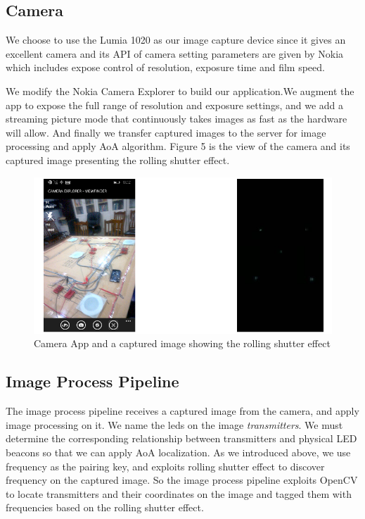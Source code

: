 \documentclass[a4paper, 11pt]{article} %
\begin{document}
\subsection{Camera}
We choose to use the Lumia 1020 as our image capture device since it gives an excellent camera and its API of camera setting parameters are given by Nokia which includes expose control of resolution, exposure time and film speed.

We modify the Nokia Camera Explorer\cite{NCE} to build our application.We augment the app to expose the full range of resolution and exposure settings, and we add a streaming picture mode that continuously takes images as fast as the hardware will allow. And finally we transfer captured images to the server for image processing and apply AoA algorithm. Figure 5 is the view of the camera and its captured image presenting the rolling shutter effect.
\begin{figure}[h]
	\centering 
	\includegraphics[width=0.8\linewidth]{Figure5.png}
	\caption{Camera App and a captured image showing the rolling shutter effect}
	\label{fig:subfig}
\end{figure}

\subsection{Image Process Pipeline}
The image process pipeline receives a captured image from the camera, and apply image processing on it. We name the leds on the image \textit{transmitters}. We must determine the corresponding relationship between transmitters and physical LED beacons so that we can apply AoA localization. As we introduced above, we use frequency as the pairing key, and exploits rolling shutter effect to discover frequency on the captured image. So the image process pipeline exploits OpenCV to locate transmitters and their coordinates on the image and tagged them with frequencies based on the rolling shutter effect.
\end{document}
